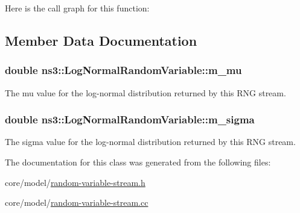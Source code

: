 Here is the call graph for this function\+:




\subsection{Member Data Documentation}
\subsubsection[{\texorpdfstring{m\+\_\+mu}{m_mu}}]{\setlength{\rightskip}{0pt plus 5cm}double ns3\+::\+Log\+Normal\+Random\+Variable\+::m\+\_\+mu\hspace{0.3cm}{\ttfamily [private]}}\hypertarget{classns3_1_1LogNormalRandomVariable_a562108c77ea1dbc4786fe96d037b0fc9}{}\label{classns3_1_1LogNormalRandomVariable_a562108c77ea1dbc4786fe96d037b0fc9}
The mu value for the log-\/normal distribution returned by this R\+NG stream. 
\subsubsection[{\texorpdfstring{m\+\_\+sigma}{m_sigma}}]{\setlength{\rightskip}{0pt plus 5cm}double ns3\+::\+Log\+Normal\+Random\+Variable\+::m\+\_\+sigma\hspace{0.3cm}{\ttfamily [private]}}\hypertarget{classns3_1_1LogNormalRandomVariable_a5836fe394673dd9f142e3a15904419a9}{}\label{classns3_1_1LogNormalRandomVariable_a5836fe394673dd9f142e3a15904419a9}
The sigma value for the log-\/normal distribution returned by this R\+NG stream. 

The documentation for this class was generated from the following files\+:\begin{DoxyCompactItemize}
\item 
core/model/\hyperlink{random-variable-stream_8h}{random-\/variable-\/stream.\+h}\item 
core/model/\hyperlink{random-variable-stream_8cc}{random-\/variable-\/stream.\+cc}\end{DoxyCompactItemize}
